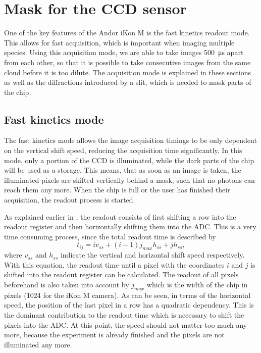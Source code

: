 
\section{Mask for the CCD sensor}
\label{sec:maskccd}
One of the key features of the Andor iKon M is the fast kinetics readout mode. This allows for fast acquisition, which is important when imaging multiple species. Using this acquisition mode, we are able to take images \SI{500}{\micro\second} apart from each other, so that it is possible to take consecutive images from the same cloud before it is too dilute.
The acquisition mode is explained in these sections as well as the diffractions introduced by a slit, which is needed to mask parts of the chip.

\subsection{Fast kinetics mode}
\label{ch:fast_kin}
The fast kinetics mode allows the image acquisition timings to be only dependent on the vertical shift speed, reducing the acquisition time significantly. In this mode, only a portion of the CCD is illuminated, while the dark parts of the chip will be used as a storage. This means, that as soon as an image is taken, the illuminated pixels are shifted vertically behind a mask, such that no photons can reach them any more. When the chip is full or the user has finished their acquisition, the readout process is started.

As explained earlier in , the readout consists of first shifting a row into the readout register and then horizontally shifting them into the ADC. This is a very time consuming process, since the total readout time is described by
\begin{equation}
t_{ij} = i v_{ss} + (i-1) j_{max} h_{ss}+j h_{ss},
\end{equation}
where $v_{ss}$ and $h_{ss}$ indicate the vertical and horizontal shift speed respectively.
With this equation, the readout time until a pixel with the coordinates $i$ and $j$ is shifted into the readout register can be calculated. The readout of all pixels beforehand is also taken into account by $j_{max}$ which is the width of the chip in pixels (1024 for the iKon M camera).
As can be seen, in terms of the horizontal speed, the position of the last pixel in a row has a quadratic dependency. This is the dominant contribution to the readout time which is necessary to shift the pixels into the ADC. At this point, the speed should not matter too much any more, because the experiment is already finished and the pixels are not illuminated any more.

